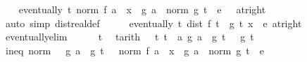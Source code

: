 \begin{isabellebody}
\ \ \isamarkupfalse%
\ {\isachardoublequoteopen}eventually\ {\isacharparenleft}{\kern0pt}{\isasymlambda}t{\isachardot}{\kern0pt}\ norm\ {\isacharparenleft}{\kern0pt}f\ a\ {\isacharminus}{\kern0pt}\ x\ {\isacharasterisk}{\kern0pt}\ g\ a{\isacharparenright}{\kern0pt}\ {\isacharslash}{\kern0pt}\ norm\ {\isacharparenleft}{\kern0pt}g\ t{\isacharparenright}{\kern0pt}\ {\isacharless}{\kern0pt}\ e\ {\isacharslash}{\kern0pt}\ {}{\isacharparenright}{\kern0pt}\ {\isacharparenleft}{\kern0pt}at{\isacharunderscore}{\kern0pt}right\ {}{\isacharparenright}{\kern0pt}{\isachardoublequoteclose}\isanewline
\ \ \ \ \isamarkupfalse%
\ {\isacharparenleft}{\kern0pt}auto\ simp{\isacharcolon}{\kern0pt}\ dist{\isacharunderscore}{\kern0pt}real{\isacharunderscore}{\kern0pt}def{\isacharparenright}{\kern0pt}\isanewline
\isanewline
\ \ \isamarkupfalse%
\ \isamarkupfalse%
\ {\isachardoublequoteopen}eventually\ {\isacharparenleft}{\kern0pt}{\isasymlambda}t{\isachardot}{\kern0pt}\ dist\ {\isacharparenleft}{\kern0pt}f\ t\ {\isacharslash}{\kern0pt}\ g\ t{\isacharparenright}{\kern0pt}\ x\ {\isacharless}{\kern0pt}\ e{\isacharparenright}{\kern0pt}\ {\isacharparenleft}{\kern0pt}at{\isacharunderscore}{\kern0pt}right\ {}{\isacharparenright}{\kern0pt}{\isachardoublequoteclose}\isanewline
\ \ \isamarkupfalse%
\ eventually{\isacharunderscore}{\kern0pt}elim\isanewline
\ \ \ \ \isamarkupfalse%
\ t\ \isamarkupfalse%
\ t{\isacharbrackleft}{\kern0pt}arith{\isacharbrackright}{\kern0pt}{\isacharcolon}{\kern0pt}\ {\isachardoublequoteopen}{}\ {\isacharless}{\kern0pt}\ t{\isachardoublequoteclose}\ {\isachardoublequoteopen}t\ {\isacharless}{\kern0pt}\ a{\isachardoublequoteclose}\ {\isachardoublequoteopen}g\ a\ {\isacharless}{\kern0pt}\ g\ t{\isachardoublequoteclose}\ {\isachardoublequoteopen}{}\ {\isacharless}{\kern0pt}\ g\ t{\isachardoublequoteclose}\isanewline
\ \ \ \ \isamarkupfalse%
\ ineq{\isacharcolon}{\kern0pt}\ {\isachardoublequoteopen}norm\ {\isacharparenleft}{\kern0pt}{}\ {\isacharminus}{\kern0pt}\ g\ a\ {\isacharslash}{\kern0pt}\ g\ t{\isacharparenright}{\kern0pt}\ {\isacharless}{\kern0pt}\ {}{\isachardoublequoteclose}\ {\isachardoublequoteopen}norm\ {\isacharparenleft}{\kern0pt}f\ a\ {\isacharminus}{\kern0pt}\ x\ {\isacharasterisk}{\kern0pt}\ g\ a{\isacharparenright}{\kern0pt}\ {\isacharslash}{\kern0pt}\ norm\ {\isacharparenleft}{\kern0pt}g\ t{\isacharparenright}{\kern0pt}\ {\isacharless}{\kern0pt}\ e\ {\isacharslash}{\kern0pt}\ {}{\isachardoublequoteclose}\isanewline

\end{isabellebody}
